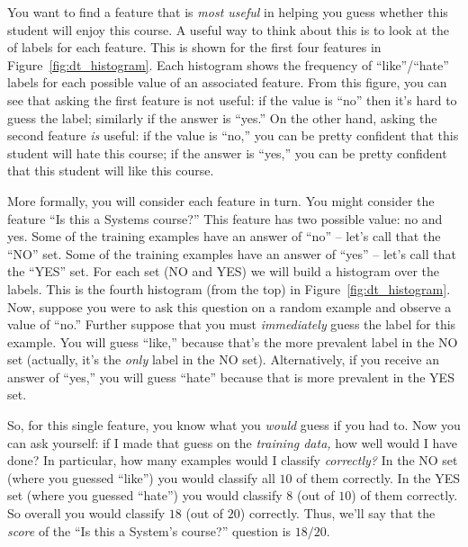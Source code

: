 You want to find a feature that is \emph{most useful} in helping you
guess whether this student will enjoy this course.
A useful way to think about this is to look at the 
of labels for each feature.
This is shown for the first four features
in Figure~\ref{fig:dt_histogram}.  Each histogram shows the frequency
of ``like''/``hate'' labels for each possible value of an associated
feature.  From this figure, you can see that asking the first feature
is not useful: if the value is ``no'' then it's hard to guess the
label; similarly if the answer is ``yes.''  On the other hand, asking
the second feature \emph{is} useful: if the value is ``no,'' you can
be pretty confident that this student will hate this course; if the
answer is ``yes,'' you can be pretty confident that this student will
like this course.

More formally, you will consider each feature in turn.  You might
consider the feature ``Is this a Systems course?''  This feature has
two possible value: no and yes.  Some of the training examples have an
answer of ``no'' -- let's call that the ``NO'' set.  Some of the
training examples have an answer of ``yes'' -- let's call that the
``YES'' set.  For each set (NO and YES) we will build a histogram over
the labels.  This is the fourth histogram (from the top) in
Figure~\ref{fig:dt_histogram}.  Now, suppose you were to ask this
question on a random example and observe a value of ``no.''  Further
suppose that you must \emph{immediately} guess the label for this
example.  You will guess ``like,'' because that's the more prevalent
label in the NO set (actually, it's the \emph{only} label in the NO
set).  Alternatively, if you receive an answer of ``yes,'' you will
guess ``hate'' because that is more prevalent in the YES set.

So, for this single feature, you know what you \emph{would} guess if
you had to.  Now you can ask yourself: if I made that guess on the
\emph{training data,} how well would I have done?  In particular, how
many examples would I classify \emph{correctly?}  In the NO set (where
you guessed ``like'') you would classify all $10$ of them correctly.
In the YES set (where you guessed ``hate'') you would classify $8$
(out of $10$) of them correctly.  So overall you would classify $18$
(out of $20$) correctly.  Thus, we'll say that the \emph{score} of the
``Is this a System's course?'' question is $18/20$.

